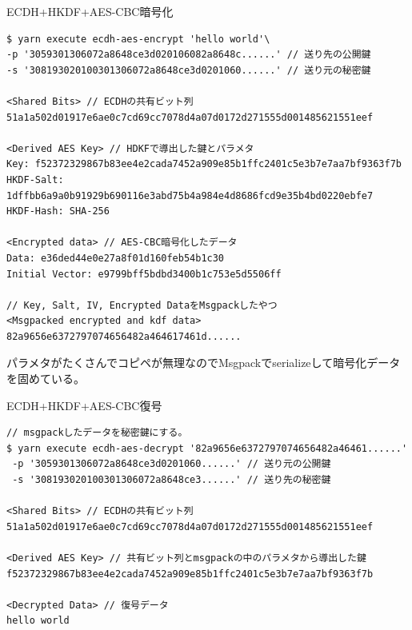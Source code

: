 \documentclass[12pt,dvipdfmx]{beamer}
\begin{document}
\begin{frame}[fragile]
\begin{exampleblock}{\small ECDH+HKDF+AES-CBC暗号化}
\scriptsize
\begin{verbatim}
$ yarn execute ecdh-aes-encrypt 'hello world'\
-p '3059301306072a8648ce3d020106082a8648c......' // 送り先の公開鍵
-s '308193020100301306072a8648ce3d0201060......' // 送り元の秘密鍵

<Shared Bits> // ECDHの共有ビット列
51a1a502d01917e6ae0c7cd69cc7078d4a07d0172d271555d001485621551eef

<Derived AES Key> // HDKFで導出した鍵とパラメタ
Key: f52372329867b83ee4e2cada7452a909e85b1ffc2401c5e3b7e7aa7bf9363f7b
HKDF-Salt: 1dffbb6a9a0b91929b690116e3abd75b4a984e4d8686fcd9e35b4bd0220ebfe7
HKDF-Hash: SHA-256

<Encrypted data> // AES-CBC暗号化したデータ
Data: e36ded44e0e27a8f01d160feb54b1c30
Initial Vector: e9799bff5bdbd3400b1c753e5d5506ff

// Key, Salt, IV, Encrypted DataをMsgpackしたやつ
<Msgpacked encrypted and kdf data>
82a9656e6372797074656482a464617461d......
\end{verbatim}
\end{exampleblock}
パラメタがたくさんでコピペが無理なのでMsgpackでserializeして暗号化データを固めている。
\end{frame}

\begin{frame}[fragile]
\begin{exampleblock}{\small ECDH+HKDF+AES-CBC復号}
\scriptsize
\begin{verbatim}
// msgpackしたデータを秘密鍵にする。
$ yarn execute ecdh-aes-decrypt '82a9656e6372797074656482a46461......'
 -p '3059301306072a8648ce3d0201060......' // 送り元の公開鍵
 -s '308193020100301306072a8648ce3......' // 送り先の秘密鍵

<Shared Bits> // ECDHの共有ビット列
51a1a502d01917e6ae0c7cd69cc7078d4a07d0172d271555d001485621551eef

<Derived AES Key> // 共有ビット列とmsgpackの中のパラメタから導出した鍵
f52372329867b83ee4e2cada7452a909e85b1ffc2401c5e3b7e7aa7bf9363f7b

<Decrypted Data> // 復号データ
hello world
\end{verbatim}
\end{exampleblock}
\end{frame}
\end{document}
